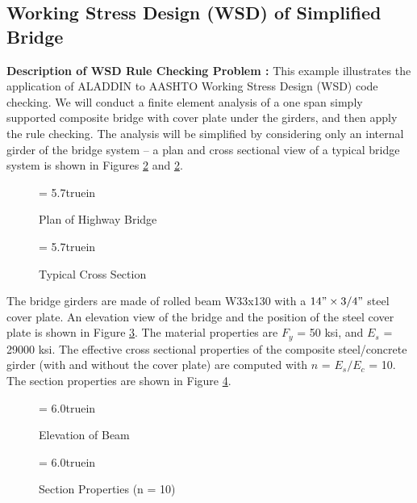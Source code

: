 \clearpage
\subsection{Working Stress Design (WSD) of Simplified Bridge}

\vspace{0.15 in}\noindent
{\bf Description of WSD Rule Checking Problem :}
This example illustrates the application of ALADDIN to
AASHTO Working Stress Design (WSD) code checking.
We will conduct a finite element analysis of a one span simply
supported composite bridge with cover plate under the girders,
and then apply the rule checking.
The analysis will be simplified by considering only an internal
girder of the bridge system -- a plan and cross sectional view of
a typical bridge system is shown in Figures \ref{fig: wsd-cross-section}
and \ref{fig: wsd-cross-section}.

\begin{figure}[ht]
\epsfxsize= 5.7truein
\centerline{}
\vspace{0.20 in}
\caption{Plan of Highway Bridge}
\label{fig: wsd-plan-of-bridge}
\end{figure}

\begin{figure}[ht]
\epsfxsize= 5.7truein
\centerline{}
\vspace{0.20 in}
\caption{Typical Cross Section}
\label{fig: wsd-cross-section}
\end{figure}

\vspace{0.15 in}\noindent
The bridge girders are made of rolled beam W33x130 with a $14" \times 3/4"$ steel cover plate.
An elevation view of the bridge and the position of the steel cover plate
is shown in Figure \ref{fig: wsd-elevation-of-beam}.
The material properties are $F_{y}$ = 50 ksi, and $E_{s}$ = 29000 ksi.
The effective cross sectional properties of the composite steel/concrete
girder (with and without the cover plate) are computed with $n$ = $E_{s}/E_{c}$ = 10.
The section properties are shown in Figure \ref{fig: wsd-section-properties}.

\begin{figure}[h]
\epsfxsize= 6.0truein
\centerline{}
\caption{Elevation of Beam}
\label{fig: wsd-elevation-of-beam}
\end{figure}

\begin{figure}[h]
\epsfxsize= 6.0truein
\centerline{}
\caption{Section Properties (n = 10)}
\label{fig: wsd-section-properties}
\end{figure}

